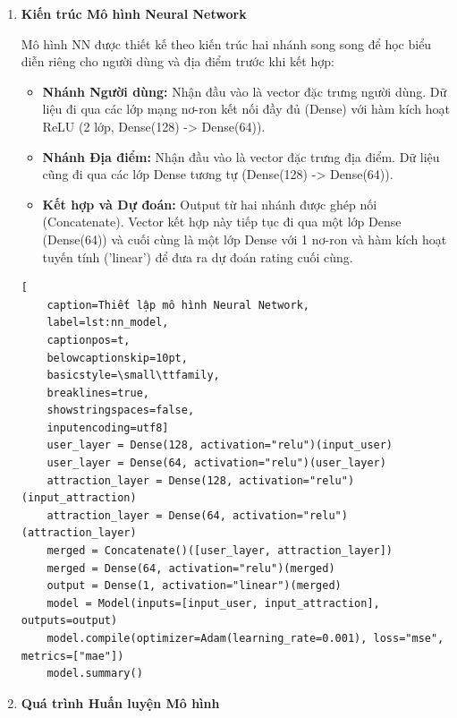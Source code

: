 \begin{enumerate}
    \item \textbf{Kiến trúc Mô hình Neural Network }

Mô hình NN được thiết kế theo kiến trúc hai nhánh song song để học biểu diễn riêng cho người dùng và địa điểm trước khi kết hợp:

\begin{itemize}
    \item \textbf{Nhánh Người dùng:} Nhận đầu vào là vector đặc trưng người dùng. Dữ liệu đi qua các lớp mạng nơ-ron kết nối đầy đủ (Dense) với hàm kích hoạt ReLU (2 lớp, Dense(128) -> Dense(64)).
    \item \textbf{Nhánh Địa điểm:} Nhận đầu vào là vector đặc trưng địa điểm. Dữ liệu cũng đi qua các lớp Dense tương tự (Dense(128) -> Dense(64)).
    \item \textbf{Kết hợp và Dự đoán:} Output từ hai nhánh được ghép nối (Concatenate). Vector kết hợp này tiếp tục đi qua một lớp Dense (Dense(64)) và cuối cùng là một lớp Dense với 1 nơ-ron và hàm kích hoạt tuyến tính ('linear') để đưa ra dự đoán rating cuối cùng.
\end{itemize}

\lstset{language=python}
\begin{lstlisting}[
    caption=Thiết lập mô hình Neural Network,
    label=lst:nn_model,
    captionpos=t,
    belowcaptionskip=10pt,
    basicstyle=\small\ttfamily,
    breaklines=true,
    showstringspaces=false,
    inputencoding=utf8] 
    user_layer = Dense(128, activation="relu")(input_user)
    user_layer = Dense(64, activation="relu")(user_layer)
    attraction_layer = Dense(128, activation="relu")(input_attraction)
    attraction_layer = Dense(64, activation="relu")(attraction_layer)
    merged = Concatenate()([user_layer, attraction_layer])
    merged = Dense(64, activation="relu")(merged)
    output = Dense(1, activation="linear")(merged)
    model = Model(inputs=[input_user, input_attraction], outputs=output)
    model.compile(optimizer=Adam(learning_rate=0.001), loss="mse", metrics=["mae"])
    model.summary()

\end{lstlisting}
    
    \item \textbf{Quá trình Huấn luyện Mô hình}
   

\end{enumerate}
